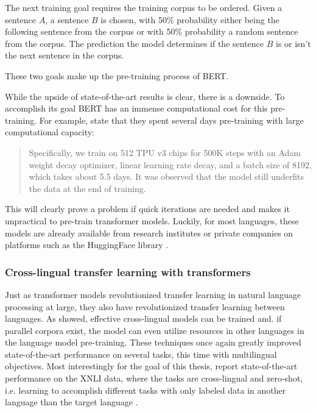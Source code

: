 \documentclass[nofilelist]{cslthse-msc}
\begin{document}
The next training goal requires the training corpus to be ordered. Given a sentence $A$, a sentence $B$ is chosen, with 50\% probability either being the following sentence from the corpus or with 50\% probability a random sentence from the corpus. The prediction the model determines if the sentence $B$ is or isn't the next sentence in the corpus. 

These two goals make up the pre-training process of BERT.

While the upside of state-of-the-art results is clear, there is a downside. To accomplish its goal BERT has an immense computational cost for this pre-training. For example, \citet{DBLP:journals/corr/abs-1906-08237} state that they spent several days pre-training with large computational capacity:

\begin{quote}
Specifically, we train on 512 TPU v3 chips for 500K steps with an Adam weight decay optimizer, linear learning rate decay, and a batch size of 8192, which takes about 5.5 days. It was observed that the model still underfits the data at the end of training.
\end{quote}

This will clearly prove a problem if quick iterations are needed and makes it unpractical to pre-train transformer models. Luckily, for most languages, these models are already available from research institutes or private companies on platforms such as the HuggingFace library \citep{Wolf2019HuggingFacesTS}.

\subsubsection{Cross-lingual transfer learning with transformers}

Just as transformer models revolutionized transfer learning in natural language processing at large, they also have revolutionized transfer learning between languages. As \citet{DBLP:journals/corr/abs-1901-07291} showed, effective cross-lingual models can be trained and. if parallel corpora exist, the model can even utilize resources in other languages in the language model pre-training. These techniques once again greatly improved state-of-the-art performance on several tasks, this time with multilingual objectives. Most interestingly for the goal of this thesis, \citeauthor{DBLP:journals/corr/abs-1901-07291}  report state-of-the-art performance on the XNLI data, where the tasks are cross-lingual and zero-shot, i.e. learning to accomplish different tasks with only labeled data in another language than the target language \citep{DBLP:journals/corr/abs-1809-05053}.
\end{document}

